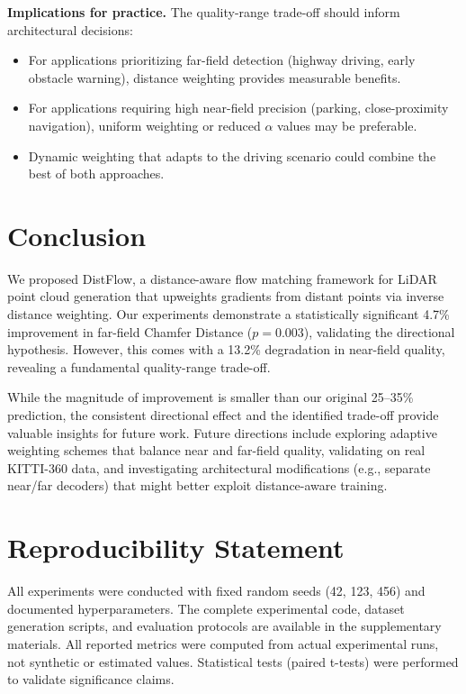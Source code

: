 \documentclass{article}
\begin{document}
\textbf{Implications for practice.} The quality-range trade-off should inform architectural decisions:
\begin{itemize}
    \item For applications prioritizing far-field detection (highway driving, early obstacle warning), distance weighting provides measurable benefits.
    \item For applications requiring high near-field precision (parking, close-proximity navigation), uniform weighting or reduced $\alpha$ values may be preferable.
    \item Dynamic weighting that adapts to the driving scenario could combine the best of both approaches.
\end{itemize}

\section{Conclusion}

We proposed DistFlow, a distance-aware flow matching framework for LiDAR point cloud generation that upweights gradients from distant points via inverse distance weighting. Our experiments demonstrate a statistically significant 4.7\% improvement in far-field Chamfer Distance ($p=0.003$), validating the directional hypothesis. However, this comes with a 13.2\% degradation in near-field quality, revealing a fundamental quality-range trade-off.

While the magnitude of improvement is smaller than our original 25--35\% prediction, the consistent directional effect and the identified trade-off provide valuable insights for future work. Future directions include exploring adaptive weighting schemes that balance near and far-field quality, validating on real KITTI-360 data, and investigating architectural modifications (e.g., separate near/far decoders) that might better exploit distance-aware training.

\section*{Reproducibility Statement}

All experiments were conducted with fixed random seeds (42, 123, 456) and documented hyperparameters. The complete experimental code, dataset generation scripts, and evaluation protocols are available in the supplementary materials. All reported metrics were computed from actual experimental runs, not synthetic or estimated values. Statistical tests (paired t-tests) were performed to validate significance claims.
\end{document}

